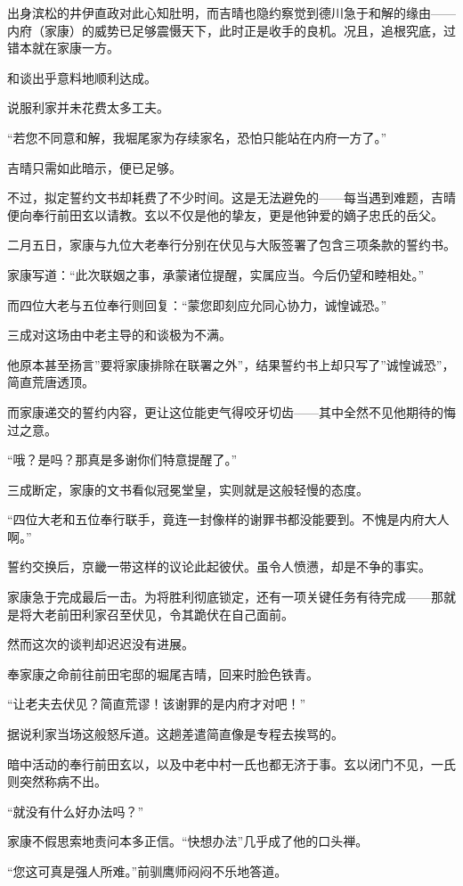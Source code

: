 \documentclass[
]{article}
\begin{document}
出身滨松的井伊直政对此心知肚明，而吉晴也隐约察觉到德川急于和解的缘由------内府（家康）的威势已足够震慑天下，此时正是收手的良机。况且，追根究底，过错本就在家康一方。

和谈出乎意料地顺利达成。

说服利家并未花费太多工夫。

``若您不同意和解，我堀尾家为存续家名，恐怕只能站在内府一方了。''

吉晴只需如此暗示，便已足够。

不过，拟定誓约文书却耗费了不少时间。这是无法避免的------每当遇到难题，吉晴便向奉行前田玄以请教。玄以不仅是他的挚友，更是他钟爱的嫡子忠氏的岳父。

二月五日，家康与九位大老奉行分别在伏见与大阪签署了包含三项条款的誓约书。

家康写道：``此次联姻之事，承蒙诸位提醒，实属应当。今后仍望和睦相处。''

而四位大老与五位奉行则回复：``蒙您即刻应允同心协力，诚惶诚恐。''

三成对这场由中老主导的和谈极为不满。

他原本甚至扬言''要将家康排除在联署之外''，结果誓约书上却只写了''诚惶诚恐''，简直荒唐透顶。

而家康递交的誓约内容，更让这位能吏气得咬牙切齿------其中全然不见他期待的悔过之意。

``哦？是吗？那真是多谢你们特意提醒了。''

三成断定，家康的文书看似冠冕堂皇，实则就是这般轻慢的态度。

``四位大老和五位奉行联手，竟连一封像样的谢罪书都没能要到。不愧是内府大人啊。''

誓约交换后，京畿一带这样的议论此起彼伏。虽令人愤懑，却是不争的事实。

家康急于完成最后一击。为将胜利彻底锁定，还有一项关键任务有待完成------那就是将大老前田利家召至伏见，令其跪伏在自己面前。

然而这次的谈判却迟迟没有进展。

奉家康之命前往前田宅邸的堀尾吉晴，回来时脸色铁青。

``让老夫去伏见？简直荒谬！该谢罪的是内府才对吧！''

据说利家当场这般怒斥道。这趟差遣简直像是专程去挨骂的。

暗中活动的奉行前田玄以，以及中老中村一氏也都无济于事。玄以闭门不见，一氏则突然称病不出。

``就没有什么好办法吗？''

家康不假思索地责问本多正信。``快想办法''几乎成了他的口头禅。

``您这可真是强人所难。''前驯鹰师闷闷不乐地答道。
\end{document}
